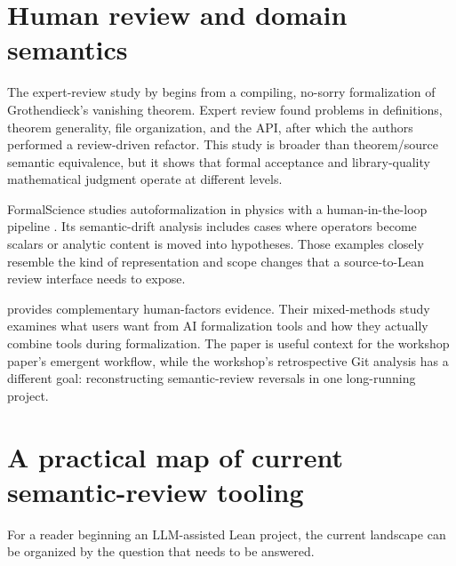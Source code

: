 \documentclass[11pt]{article}
\begin{document}
\section{Human review and domain semantics}

The expert-review study by \citet{ilin2026sorries} begins from a compiling,
no-sorry formalization of Grothendieck's vanishing theorem.  Expert review found
problems in definitions, theorem generality, file organization, and the API,
after which the authors performed a review-driven refactor.  This study is
broader than theorem/source semantic equivalence, but it shows that formal
acceptance and library-quality mathematical judgment operate at different
levels.

FormalScience studies autoformalization in physics with a human-in-the-loop
pipeline \citep{meadows2026formalscience}.  Its semantic-drift analysis includes
cases where operators become scalars or analytic content is moved into
hypotheses.  Those examples closely resemble the kind of representation and
scope changes that a source-to-Lean review interface needs to expose.

\citet{collins2026humanai} provides complementary human-factors evidence.  Their
mixed-methods study examines what users want from AI formalization tools and how
they actually combine tools during formalization.  The paper is useful context
for the workshop paper's emergent workflow, while the workshop's retrospective
Git analysis has a different goal: reconstructing semantic-review reversals in
one long-running project.


\section{A practical map of current semantic-review tooling}

For a reader beginning an LLM-assisted Lean project, the current landscape can
be organized by the question that needs to be answered.
\end{document}
